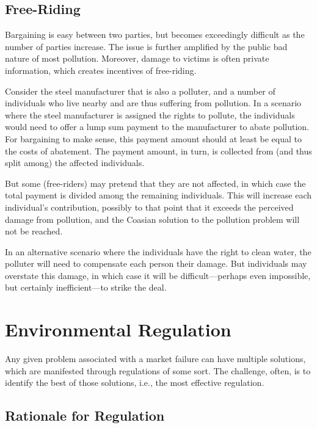 \documentclass[
]{book}
\begin{document}
\hypertarget{free-riding}{%
\section{Free-Riding}\label{free-riding}}

Bargaining is easy between two parties, but becomes exceedingly difficult as the number of parties increase. The issue is further amplified by the public bad nature of most pollution. Moreover, damage to victims is often private information, which creates incentives of free-riding.

Consider the steel manufacturer that is also a polluter, and a number of individuals who live nearby and are thus suffering from pollution. In a scenario where the steel manufacturer is assigned the rights to pollute, the individuals would need to offer a lump sum payment to the manufacturer to abate pollution. For bargaining to make sense, this payment amount should at least be equal to the costs of abatement. The payment amount, in turn, is collected from (and thus split among) the affected individuals.

But some (free-riders) may pretend that they are not affected, in which case the total payment is divided among the remaining individuals. This will increase each individual's contribution, possibly to that point that it exceeds the perceived damage from pollution, and the Coasian solution to the pollution problem will not be reached.

In an alternative scenario where the individuals have the right to clean water, the polluter will need to compensate each person their damage. But individuals may overstate this damage, in which case it will be difficult---perhaps even impossible, but certainly inefficient---to strike the deal.

\hypertarget{environmental-regulation}{%
\chapter{Environmental Regulation}\label{environmental-regulation}}

Any given problem associated with a market failure can have multiple solutions, which are manifested through regulations of some sort. The challenge, often, is to identify the best of those solutions, i.e., the most effective regulation.

\hypertarget{rationale-for-regulation}{%
\section{Rationale for Regulation}\label{rationale-for-regulation}}
\end{document}
